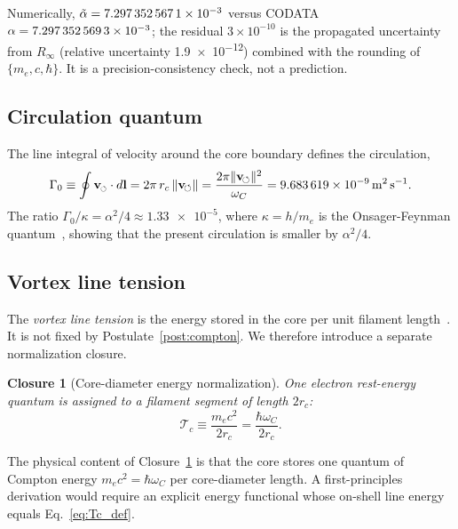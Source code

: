 \documentclass[aps,pra,preprint,longbibliography,nofootinbib]{revtex4-2}
\newtheorem{closure}{Closure}
\newcommand{\rotarrow}{%
  \mathchoice{\mkern-2mu\scriptstyle\boldsymbol{\circlearrowleft}}%
             {\mkern-2mu\scriptstyle\boldsymbol{\circlearrowleft}}%
             {\mkern-2mu\scriptscriptstyle\boldsymbol{\circlearrowleft}}%
             {\mkern-2mu\scriptscriptstyle\boldsymbol{\circlearrowleft}}}
\newcommand{\vc}{\mathbf{v}_{\rotarrow}}        %
\newcommand{\vnorm}{\lVert\mathbf{v}_{\!\boldsymbol{\circlearrowleft}}\rVert} %
\newcommand{\rc}{r_c}                            %
\newcommand{\omC}{\omega_C}                      %
\newcommand{\Rinf}{R_\infty}                     %
\newcommand{\Tc}{\mathcal{T}_c}                  %
\newcommand{\Gz}{\Gamma_0}                       %
\begin{document}
Numerically, $\tilde\alpha = \num{7.297\,352\,567\,1e-3}$
versus CODATA $\alpha = \num{7.297\,352\,569\,3e-3}$;
the residual $3\times10^{-10}$ is the propagated uncertainty
from $\Rinf$ (relative uncertainty \SI{1.9e-12}{}) combined with
the rounding of $\{m_e, c, \hbar\}$.
It is a precision-consistency check, not a prediction.

\subsection{Circulation quantum}
\label{sec:Gamma0}

The line integral of velocity around the core boundary defines the
circulation,
\begin{equation}
  \Gz \equiv \oint \vc\cdot d\mathbf{l}
           = 2\pi\,\rc\,\vnorm
           = \frac{2\pi\vnorm^2}{\omC}
           = \SI{9.683\,619e-9}{\meter\squared\per\second}.
  \label{eq:Gamma0}
\end{equation}
The ratio $\Gz/\kappa = \alpha^2/4 \approx \num{1.33e-5}$,
where $\kappa = h/m_e$ is the Onsager-Feynman quantum~\cite{Onsager1949,Feynman1955},
showing that the present circulation is smaller by $\alpha^2/4$.

\subsection{Vortex line tension}
\label{sec:Tc}

The \emph{vortex line tension} is the energy stored in the core per
unit filament length~\cite{Saffman1992}.  It is not fixed by
Postulate~\ref{post:compton}.  We therefore introduce a separate
normalization closure.

\begin{closure}[Core-diameter energy normalization]
\label{cl:tension}
One electron rest-energy quantum is assigned to a filament segment of
length $2\rc$:
\begin{equation}
  \Tc \equiv \frac{m_e c^2}{2\rc} = \frac{\hbar\omC}{2\rc}.
  \label{eq:Tc_def}
\end{equation}
\end{closure}

The physical content of Closure~\ref{cl:tension} is that the core stores
one quantum of Compton energy $m_e c^2=\hbar\omega_C$ per core-diameter
length.  A first-principles derivation would require an explicit
energy functional whose on-shell line energy equals Eq.~\eqref{eq:Tc_def}.
\end{document}
